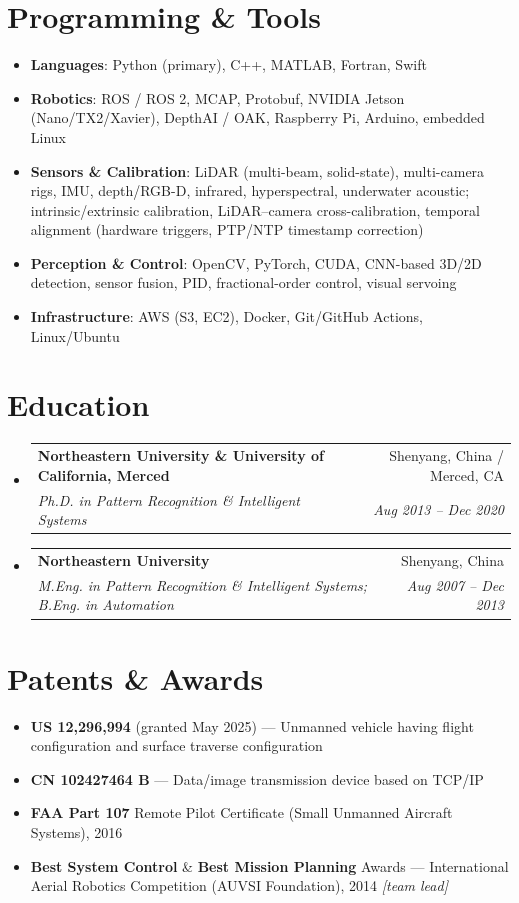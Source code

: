 \documentclass[letterpaper,10pt]{article}
\makeatletter
\newcommand{\resumeBullet}[1]{
  \item\small{#1 \vspace{-2pt}}
}
\newcommand{\resumeSubheading}[4]{
  \vspace{-1pt}\item
    \begin{tabular*}{0.97\textwidth}{l@{\extracolsep{\fill}}r}
      \textbf{#1} & #2 \\
      \textit{\small#3} & \textit{\small #4} \\
    \end{tabular*}\vspace{-5pt}
}
\newcommand{\resumeSubHeadingListStart}{\begin{itemize}[leftmargin=*]}
\newcommand{\resumeSubHeadingListEnd}{\end{itemize}}
\makeatother
\begin{document}
\section{Programming \& Tools}
  \resumeSubHeadingListStart
    \item\small{\textbf{Languages}: Python (primary), C++, MATLAB, Fortran, Swift}
    \item\small{\textbf{Robotics}: ROS / ROS 2, MCAP, Protobuf, NVIDIA Jetson (Nano/TX2/Xavier), DepthAI / OAK, Raspberry Pi, Arduino, embedded Linux}
    \item\small{\textbf{Sensors \& Calibration}: LiDAR (multi-beam, solid-state), multi-camera rigs, IMU, depth/RGB-D, infrared, hyperspectral, underwater acoustic; intrinsic/extrinsic calibration, LiDAR--camera cross-calibration, temporal alignment (hardware triggers, PTP/NTP timestamp correction)}
    \item\small{\textbf{Perception \& Control}: OpenCV, PyTorch, CUDA, CNN-based 3D/2D detection, sensor fusion, PID, fractional-order control, visual servoing}
    \item\small{\textbf{Infrastructure}: AWS (S3, EC2), Docker, Git/GitHub Actions, Linux/Ubuntu}
  \resumeSubHeadingListEnd

\section{Education}
  \resumeSubHeadingListStart
    \resumeSubheading
      {Northeastern University \& University of California, Merced}{Shenyang, China / Merced, CA}
      {Ph.D. in Pattern Recognition \& Intelligent Systems}{Aug 2013 -- Dec 2020}
    \resumeSubheading
      {Northeastern University}{Shenyang, China}
      {M.Eng. in Pattern Recognition \& Intelligent Systems; B.Eng. in Automation}{Aug 2007 -- Dec 2013}
  \resumeSubHeadingListEnd

\section{Patents \& Awards}
  \resumeSubHeadingListStart
    \resumeBullet{\textbf{US 12,296,994} (granted May 2025) --- Unmanned vehicle having flight configuration and surface traverse configuration}
    \resumeBullet{\textbf{CN 102427464 B} --- Data/image transmission device based on TCP/IP}
    \resumeBullet{\textbf{FAA Part 107} Remote Pilot Certificate (Small Unmanned Aircraft Systems), 2016}
    \resumeBullet{\textbf{Best System Control} \& \textbf{Best Mission Planning} Awards --- International Aerial Robotics Competition (AUVSI Foundation), 2014 \textit{[team lead]}}
  \resumeSubHeadingListEnd
\end{document}
